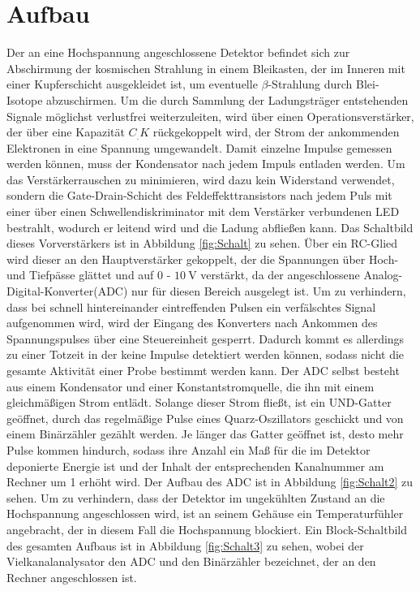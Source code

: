 \section{Aufbau}
\label{sec:Aufbau}

Der an eine Hochspannung angeschlossene Detektor befindet sich zur Abschirmung der kosmischen Strahlung in einem Bleikasten, der im Inneren mit einer Kupferschicht ausgekleidet ist, um eventuelle $\beta$-Strahlung durch Blei-Isotope abzuschirmen. 
Um die durch Sammlung der Ladungsträger entstehenden Signale möglichst verlustfrei weiterzuleiten, wird über einen Operationsverstärker, der über eine Kapazität $C_.K$ rückgekoppelt wird, der Strom der ankommenden Elektronen in eine Spannung umgewandelt. 
Damit einzelne Impulse gemessen werden können, muss der Kondensator nach jedem Impuls entladen werden. Um das Verstärkerrauschen zu minimieren, wird dazu kein Widerstand verwendet, sondern die Gate-Drain-Schicht des Feldeffekttransistors nach jedem Puls mit einer über einen Schwellendiskriminator mit dem Verstärker verbundenen LED bestrahlt, wodurch er leitend wird und die Ladung abfließen kann. Das Schaltbild dieses Vorverstärkers ist in Abbildung \ref{fig:Schalt} zu sehen.
Über ein RC-Glied wird dieser an den Hauptverstärker gekoppelt, der die Spannungen über Hoch- und Tiefpässe glättet und auf $0$ - $\SI{10}{\volt}$ verstärkt, da der angeschlossene Analog-Digital-Konverter(ADC) nur für diesen Bereich ausgelegt ist. Um zu verhindern, dass bei schnell hintereinander eintreffenden Pulsen ein verfälschtes Signal aufgenommen wird, wird der Eingang des Konverters nach Ankommen des Spannungspulses über eine Steuereinheit gesperrt. Dadurch kommt es allerdings zu einer Totzeit in der keine Impulse detektiert werden können, sodass nicht die gesamte Aktivität einer Probe bestimmt werden kann.
Der ADC selbst besteht aus einem Kondensator und einer Konstantstromquelle, die ihn mit einem gleichmäßigen Strom entlädt.
Solange dieser Strom fließt, ist ein UND-Gatter geöffnet, durch das regelmäßige Pulse eines Quarz-Oszillators geschickt und von einem Binärzähler gezählt werden.
Je länger das Gatter geöffnet ist, desto mehr Pulse kommen hindurch, sodass ihre Anzahl ein Maß für die im Detektor deponierte Energie ist und der Inhalt der entsprechenden Kanalnummer am Rechner um 1 erhöht wird. Der Aufbau des ADC ist in Abbildung \ref{fig:Schalt2} zu sehen. 
Um zu verhindern, dass der Detektor im ungekühlten Zustand an die Hochspannung angeschlossen wird, ist an seinem Gehäuse ein Temperaturfühler angebracht, der in diesem Fall die Hochspannung blockiert. Ein Block-Schaltbild des gesamten Aufbaus ist in Abbildung \ref{fig:Schalt3} zu sehen, wobei der Vielkanalanalysator den ADC und den Binärzähler bezeichnet, der an den Rechner angeschlossen ist.


